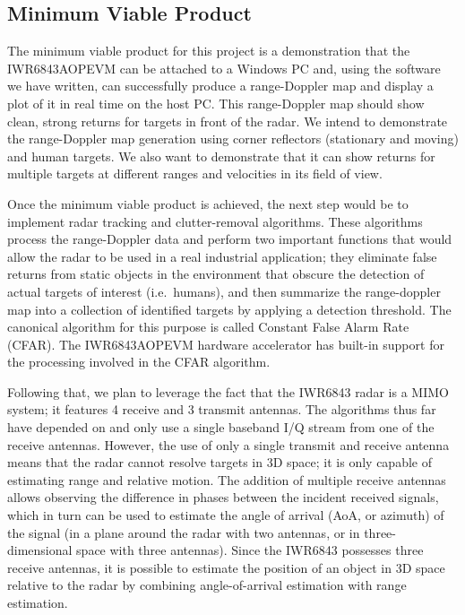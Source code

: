 \documentclass[12pt, oneside, titlepage, final]{article}
\begin{document}
	\subsection{Minimum Viable Product}

	The minimum viable product for this project is a demonstration that the IWR6843AOPEVM can be attached
	to a Windows PC and, using the software we have written, can successfully produce a range-Doppler map
	and display a plot of it in real time on the host PC\@. This range-Doppler map should show clean,
	strong returns for targets in front of the radar. We intend to demonstrate the range-Doppler map
	generation using corner reflectors (stationary and moving) and human targets. We also want to
	demonstrate that it can show returns for multiple targets at different ranges and velocities in its
	field of view.

	Once the minimum viable product is achieved, the next step would be to implement radar tracking and
	clutter-removal algorithms. These algorithms process the range-Doppler data and perform two important
	functions that would allow the radar to be used in a real industrial application; they eliminate false
	returns from static objects in the environment that obscure the detection of actual targets of
	interest (i.e.\ humans), and then summarize the range-doppler map into a collection of identified
	targets by applying a detection threshold. The canonical algorithm for this purpose is called Constant
	False Alarm Rate (CFAR). The IWR6843AOPEVM hardware accelerator has built-in support for the
	processing involved in the CFAR algorithm.

	Following that, we plan to leverage the fact that the IWR6843 radar is a MIMO system; it features 4
	receive and 3 transmit antennas. The algorithms thus far have depended on and only use a single
	baseband I/Q stream from one of the receive antennas. However, the use of only a single transmit and
	receive antenna means that the radar cannot resolve targets in 3D space; it is only capable of
	estimating range and relative motion. The addition of multiple receive antennas allows observing the
	difference in phases between the incident received signals, which in turn can be used to estimate the
	angle of arrival (AoA, or azimuth) of the signal (in a plane around the radar with two antennas, or in
	three-dimensional space with three antennas). Since the IWR6843 possesses three receive antennas, it
	is possible to estimate the position of an object in 3D space relative to the radar by combining
	angle-of-arrival estimation with range estimation.
\end{document}
